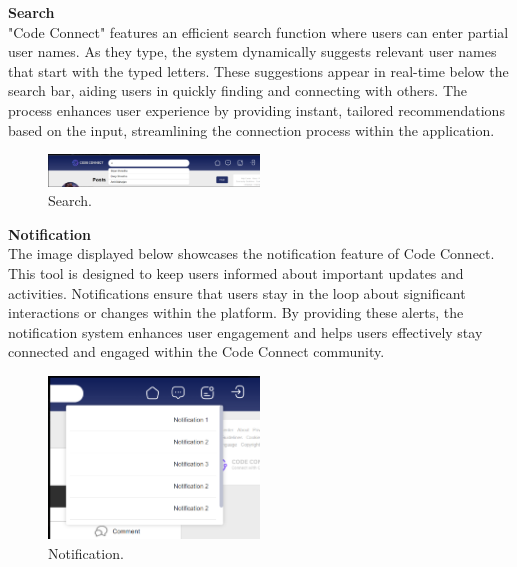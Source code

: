 \textbf{Search}
\\"Code Connect" features an efficient search function where users can enter partial user names. As they type, the system dynamically suggests relevant user names that start with the typed letters. These suggestions appear in real-time below the search bar, aiding users in quickly finding and connecting with others. The process enhances user experience by providing instant, tailored recommendations based on the input, streamlining the connection process within the application.
\begin{figure}[ht]
    \centering
    \includegraphics[width=0.5\textwidth]{Outcome-ss/search.png}
    \caption{Search.}
    \label{fig:Search}
\end{figure}

\textbf{Notification}
\\The image displayed below showcases the notification feature of Code Connect. This tool is designed to keep users informed about important updates and activities. Notifications ensure that users stay in the loop about significant interactions or changes within the platform. By providing these alerts, the notification system enhances user engagement and helps users effectively stay connected and engaged within the Code Connect community.
\begin{figure}[ht]
    \centering
    \includegraphics[width=0.5\textwidth]{Outcome-ss/notification.png}
    \caption{Notification.}
    \label{fig:Notification}
\end{figure}

